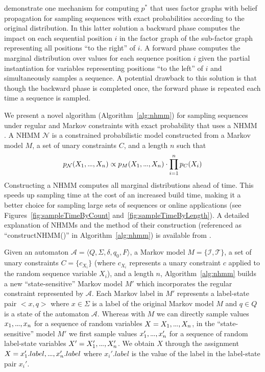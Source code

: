 \documentclass[phd,electronic,oneside,twosidetoc,letterpaper,chaptercenter,parttop,lof,lot]{byumsphd}
\newcommand\mydots{\hbox to .75em{.\hss.\hss.}}
\begin{document}
\citeauthor{papadopoulos2015exact} \cite{papadopoulos2015exact} demonstrate one mechanism for computing $p^*$ that uses factor graphs with belief propagation for sampling sequences with exact probabilities according to the original distribution. In this latter solution a backward phase computes the impact on each sequential position $i$ in the factor graph of the sub-factor graph representing all positions ``to the right'' of $i$. A forward phase computes the marginal distribution over values for each sequence position $i$ given the partial instantiation for variables representing positions ``to the left'' of $i$ and simultaneously samples a sequence. A potential drawback to this solution is that though the backward phase is completed once, the forward phase is repeated each time a sequence is sampled. 

We present a novel algorithm (Algorithm~\ref{alg:nhmm}) for sampling sequences under regular and Markov constraints with exact probability that uses a NHMM \cite{pachet2011finite}. A NHMM $\mathcal{N}$ is a constrained probabilistic model constructed from a Markov model $M$, a set of unary constraints $C$, and a length $n$ such that 
\[
  p_\mathcal{N}(X_1,\mydots,X_n) \propto   
	p_M(X_1,\mydots,X_n)\cdot\prod_{i=1}^n p_C(X_i)\\
\]
Constructing a NHMM computes all marginal distributions ahead of time. This speeds up sampling time at the cost of an increased build time, making it a better choice for sampling large sets of sequences or online applications (see Figures~\ref{fig:sampleTimeByCount} and~\ref{fig:sampleTimeByLength}). A detailed explanation of NHMMs and the method of their construction (referenced as ``constructNHMM()'' in Algorithm~\ref{alg:nhmm}) is available from \citeauthor{pachet2011finite} \cite{pachet2011finite}.

Given an automaton $\mathcal{A}=\langle Q, \Sigma, \delta, q_0, F \rangle$, a Markov model $M=\{\mathcal{I},\mathcal{T}\}$, a set of unary constraints $C=\{c_{X_i}\}$ (where $c_{X_i}$ represents a unary constraint $c$ applied to the random sequence variable $X_i$), and a length $n$, Algorithm~\ref{alg:nhmm} builds a new ``state-sensitive'' Markov model $M'$ which incorporates the regular constraint represented by $\mathcal{A}$. Each Markov label in $M'$ represents a label-state pair $<x,q>$ where $x\in\Sigma$ is a label of the original Markov model $M$ and $q\in Q$ is a state of the automaton $\mathcal{A}$. Whereas with $M$ we can directly sample values $x_1,\mydots,x_n$ for a sequence of random variables $X=X_1,\mydots,X_n$, in the ``state-sensitive'' model $M'$ we first sample values $x_1',\mydots,x_n'$  for a sequence of random label-state variables $X'=X_1',\mydots,X_n'$. We obtain $X$ through the assignment $X=x_1'.label,\mydots,x_n'.label$ where $x_i'.label$ is the value of the label in the label-state pair $x_i'$.
\end{document}
